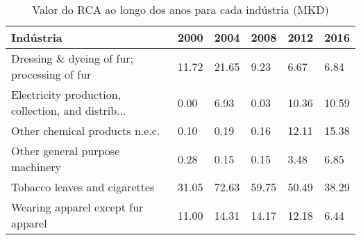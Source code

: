 \begin{table}
\centering
\caption{Valor do RCA ao longo dos anos para cada indústria (MKD)}
\begin{tabular}{p{6cm}p{1.5cm}p{1.5cm}p{1.5cm}p{1.5cm}p{1.5cm}}
\toprule
                                         Indústria &  2000 &  2004 &  2008 &  2012 &  2016 \\
\midrule
       Dressing \& dyeing of fur; processing of fur & 11.72 & 21.65 &  9.23 &  6.67 &  6.84 \\
Electricity production, collection, and distrib... &  0.00 &  6.93 &  0.03 & 10.36 & 10.59 \\
                    Other chemical products n.e.c. &  0.10 &  0.19 &  0.16 & 12.11 & 15.38 \\
                   Other general purpose machinery &  0.28 &  0.15 &  0.15 &  3.48 &  6.85 \\
                     Tobacco leaves and cigarettes & 31.05 & 72.63 & 59.75 & 50.49 & 38.29 \\
                Wearing apparel except fur apparel & 11.00 & 14.31 & 14.17 & 12.18 &  6.44 \\
\bottomrule
\end{tabular}
\end{table}
